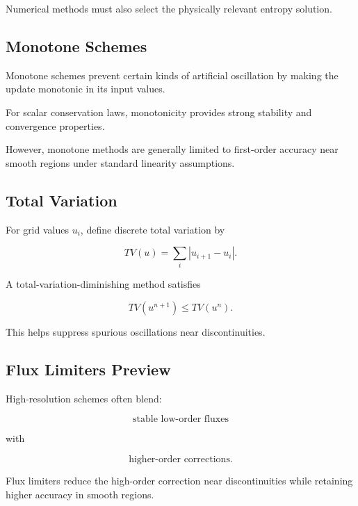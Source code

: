 Numerical methods must also select the physically relevant entropy
solution.

\subsection{Monotone Schemes}
\label{subsec:monotone-schemes}

Monotone schemes prevent certain kinds of artificial oscillation by making
the update monotonic in its input values.

For scalar conservation laws, monotonicity provides strong stability and
convergence properties.

However, monotone methods are generally limited to first-order accuracy
near smooth regions under standard linearity assumptions.

\subsection{Total Variation}
\label{subsec:total-variation}

For grid values \(u_i\), define discrete total variation by

\[
\boxed{
TV(u)
=
\sum_i
|u_{i+1}-u_i|.
}
\]

A total-variation-diminishing method satisfies

\[
\boxed{
TV(u^{n+1})
\leq
TV(u^n).
}
\]

This helps suppress spurious oscillations near discontinuities.

\subsection{Flux Limiters Preview}
\label{subsec:flux-limiters}

High-resolution schemes often blend:

\[
\boxed{
\text{stable low-order fluxes}
}
\]

with

\[
\boxed{
\text{higher-order corrections}.
}
\]

Flux limiters reduce the high-order correction near discontinuities while
retaining higher accuracy in smooth regions.

